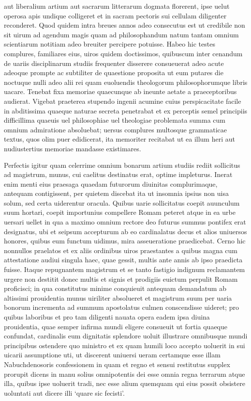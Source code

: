 \documentclass[a5paper,twoside]{article}
\begin{document}
aut liberalium artium aut sacrarum litterarum dogmata florerent, ipse uelut operosa apis undique colligeret et in sacram pectoris sui cellulam diligenter reconderet. Quod quidem intra breues annos adeo consecutus est ut credibile non sit uirum ad agendum magis quam ad philosophandum natum tantam omnium scientiarum notitiam adeo breuiter percipere potuisse. Habeo hic testes complures, familiares eius, uiros quidem doctissimos, quibuscum inter cenandum de uariis disciplinarum studiis frequenter disserere consueuerat adeo acute adeoque prompte ac subtiliter de quaestione proposita ut eum putares die noctuque nulli adeo alii rei quam euoluendis theologorum philosophorumque libris uacare. Tenebat fixa memoriae quaecunque ab ineunte aetate a praeceptoribus audierat. Vigebat praeterea stupendo ingenii acumine cuius perspicacitate facile in abditissima quaeque naturae secreta penetrabat et ex perceptis semel principiis difficillima quaeuis uel philosophiae uel theologiae problemata summa cum omnium admiratione absoluebat; uersus complures multosque grammaticae textus, quos olim puer edidicerat, ita memoriter recitabat ut ea illum heri aut nudiustertius memoriae mandasse existimares. 

Perfectis igitur quam celerrime omnium bonarum artium studiis rediit sollicitus ad magistrum, munus, cui caelitus destinatus erat, optime impleturus.  Inerat enim menti eius praesaga quaedam futurorum diuinitas complurimaque, antequam contigissent, per quietem discebat ita ut insomnia ipsius non uisa solum, sed certa uiderentur oracula. Quibus uarie sollicitatus coepit auunculum suum hortari, coepit importunius compellere Romam peteret atque in ea urbe uersari uellet in qua a maximo omnium rectore deo futurus summus pontifex erat designatus, ubi et seipsum accepturum ab eo cardinalatus decus et alios uniuersos honores, quibus eum functum uidimus, mira asseueratione praedicebat. Cerno hic nonnullos praelatos et ex aliis ordinibus uiros praestantes a quibus magna cum attestatione audiui singula haec, quae gessit, multis ante annis ab ipso praedicta fuisse.  Itaque repugnantem magistrum et se tanto fastigio indignum reclamantem urgere non destitit donec multis et signis et prodigiis euictum perpulit Romam proficisci; in qua constitutus minime conquieuit antequam demandatum ab altissimi prouidentia munus uiriliter absolueret et magistrum suum per uaria bonorum incrementa ad summum apostolatus culmen conscendisse uideret; pro quibus laboribus et pro tam diligenti nauata opera eadem ipsa diuina prouidentia, quae semper infirma mundi eligere consueuit ut fortia quaeque confundat, cardinalis eum dignitatis splendore uoluit illustrare omnibusque mundi principibus ostendere quo ministro et ex quam humili loco accepto uoluerit in sui uicarii assumptione uti, ut discerent uniuersi ueram certamque esse illam Nabuchdenosoris confessionem in quam et regno et sensui restitutus supplex prorupit dicens in manu solius omnipotentis dei esse omnia regna terrarum atque illa, quibus ipse uoluerit tradi, nec esse alium quemquam qui eius possit obsistere uoluntati aut dicere illi `quare sic fecisti'.
\end{document}
